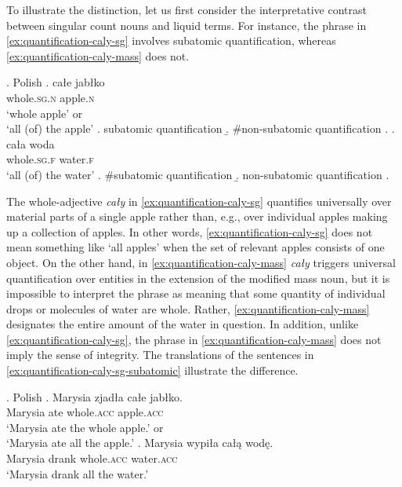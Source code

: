 To illustrate the distinction, let us first consider the interpretative contrast between singular count nouns and liquid terms. For instance, the phrase in \ref{ex:quantification-caly-sg} involves subatomic quantification, whereas \ref{ex:quantification-caly-mass} does not. 

		\ex. Polish\label{ex:quantification-caly-sg-mass}
        \ag. całe jabłko\label{ex:quantification-caly-sg}\\
		whole\textsc{.sg.n} apple\textsc{.n}\\
		`whole apple' or\\
		`all (of) the apple'
		\a. subatomic quantification
		\b. \#non-subatomic quantification
        \z.
		\bg. cała woda\label{ex:quantification-caly-mass}\\
		whole\textsc{.sg.f} water\textsc{.f}\\
		`all (of) the water'
		\a. \#subatomic quantification
		\b. non-subatomic quantification
		\z.

The whole-adjective \textit{cały} in \ref{ex:quantification-caly-sg} quantifies universally over material parts of a single apple rather than, e.g., over individual apples making up a collection of apples. In other words, \ref{ex:quantification-caly-sg} does not mean something like `all apples' when the set of relevant apples consists of one object. On the other hand, in \ref{ex:quantification-caly-mass} \textit{cały} triggers universal quantification over entities in the extension of the modified mass noun, but it is impossible to interpret the phrase as meaning that some quantity of individual drops or molecules of water are whole. Rather, \ref{ex:quantification-caly-mass} designates the entire amount of the water in question. In addition, unlike \ref{ex:quantification-caly-sg}, the phrase in \ref{ex:quantification-caly-mass} does not imply the sense of integrity. The translations of the sentences in \ref{ex:quantification-caly-sg-subatomic} illustrate the difference.\largerpage[-1]

\ex. Polish\label{ex:quantification-caly-sg-subatomic}
\ag. Marysia zjadła całe jabłko.\\
Marysia ate whole\textsc{.acc} apple\textsc{.acc}\\
`Marysia ate the whole apple.' or\\
`Marysia ate all the apple.'
\bg. Marysia wypiła całą wodę.\label{ex:quantification-caly-mass-superatomic}\\
Marysia drank whole\textsc{.acc} water\textsc{.acc}\\
`Marysia drank all the water.'

